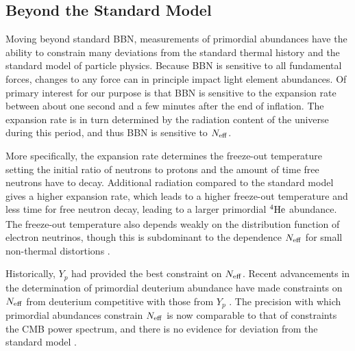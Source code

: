 



\subsection{Beyond the Standard Model}\label{BSM}
Moving beyond standard BBN, measurements of primordial abundances have the ability to constrain many deviations from the standard thermal history and the standard model of particle physics.  Because BBN is sensitive to all fundamental forces, changes to any force can in principle impact light element abundances.  Of primary interest for our purpose is that BBN is sensitive to the expansion rate between about one second and a few minutes after the end of inflation.  The expansion rate is in turn determined by the radiation content of the universe during this period, and thus BBN is sensitive to $N_{\rm eff}$.  

More specifically, the expansion rate determines the freeze-out temperature setting the initial ratio of neutrons to protons and the amount of time free neutrons have to decay.  Additional radiation compared to the standard model gives a higher expansion rate, which leads to a higher freeze-out temperature and less time for free neutron decay, leading to a larger primordial $\nucl{4}{ }{He}$ abundance.  The freeze-out temperature also depends weakly on the distribution function of electron neutrinos, though this is subdominant to the dependence $N_{\rm eff}$ for small non-thermal distortions \cite{Serpico:2004gx}.

Historically, $Y_p$ had provided the best constraint on $N_{\rm eff}$.  Recent advancements in the determination of primordial deuterium abundance have made constraints on $N_{\rm eff}$ from deuterium competitive with those from $Y_p$ \cite{Cooke:2013cba}.  The precision with which primordial abundances constrain $N_{\rm eff}$ is now comparable to that of constraints the CMB power spectrum, and there is no evidence for deviation from the standard model \cite{Ade:2015xua}.







